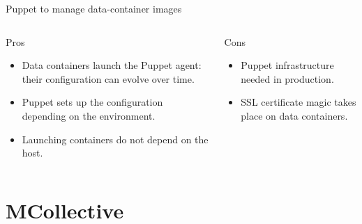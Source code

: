 \documentclass[presentation]{beamer}
\begin{document}
{
\begin{frame}[label=sec-6-6]{Puppet to manage data-container images}

\begin{columns}
\begin{column}{0.5\textwidth}
\begin{block}{Pros}

\begin{itemize}
\item Data containers launch the Puppet agent: their configuration can evolve over time.
\item Puppet sets up the configuration depending on the environment.
\item Launching containers do not depend on the host.
\end{itemize}
\end{block}
\end{column}

\begin{column}{0.5\textwidth}
\begin{block}{Cons}

\begin{itemize}
\item Puppet infrastructure needed in production.
\item SSL certificate magic takes place on data containers.
\end{itemize}
\end{block}
\end{column}
\end{columns}
\end{frame}} %

\section{MCollective}
\label{sec-7}
\end{document}
